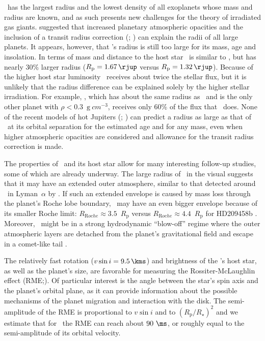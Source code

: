 \tresFour\ has the largest radius and the lowest density of all exoplanets whose
mass and radius are known, and as such presents new challenges for the theory
of irradiated gas giants. \citet{Burrows_Hubeny_Budaj:apj:2007a} suggested that increased planetary atmospheric opacities and the inclusion of a transit radius correction
(\citealp{Baraffe_Chabrier_Barman:aa:2003a}; \citealp*{Burrows_Sudarsky_Hubbard:apj:2003a}) can explain the radii of all large planets. It appears,
however, that \tresFour's radius is still too large for its mass, age and
insolation. In terms of mass and distance to the host star \tresFour\ is similar
to \hdTZN, but has nearly 30\% larger radius ($R_{\mathrm p} = 1.67\,\rjup$ versus $R_{\mathrm p} = 1.32\,\rjup$). Because of the higher host star luminosity \tresFour\ receives about twice the stellar flux, but it is unlikely that the radius difference can be explained solely by the higher stellar
irradiation. For example, \hatponeb, which has about the same radius as
\hdTZN\ and is the only other planet with $\rho < 0.3$~${\mathrm g \: cm^{-3}}$,
receives only 60\% of the flux that \hdTZN\ does. None of the recent models
of hot Jupiters (\citealp*[e.g.,][]{Fortney_Marley_Barnes:apj:2007a}; \citealp{Burrows_Hubeny_Budaj:apj:2007a}) can predict a radius as %
large as that of \tresFour\ at its orbital separation for the estimated age and
for any mass, even when higher atmospheric opacities are considered and
allowance for the transit radius correction is made.

The properties of \tresFour\ and its host star allow for many interesting follow-up
studies, some of which are already underway. The large radius of \tresFour\ in the
visual suggests that it may have an extended outer atmosphere, similar to that
detected around \hdTZN\ in Lyman~$\alpha$ by \citet{Vidal-Madjar_Lecavelier-des-Etangs_Desert:nat:2003a}. If such an
extended envelope is caused by mass loss through the planet's Roche lobe
boundary, \tresFour\ may have an even bigger envelope because of its smaller
Roche limit: $R_{\mathrm Roche} \approx 3.5$~$R_{\mathrm p}$ versus
$R_{\mathrm Roche} \approx 4.4$~$R_{\mathrm p}$ for HD209458b \citep{Erkaev_Lammer_Kulikov:preprint:2007a}.
Moreover, \tresFour\ might be in a strong hydrodynamic ``blow-off'' regime where the
outer atmospheric layers are detached from the planet's gravitational field and
escape in a comet-like tail \citep{Vidal-Madjar_Lecavelier-des-Etangs_Desert:nat:2003a, Lecavelier-des-Etangs_Vidal-Madjar_McConnell:aa:2004a}.

The relatively fast rotation ($v \sin i = 9.5 \, \kms$) and brightness of the
\tresFour's host star, as well as the planet's size, are favorable for measuring
the Rossiter-McLaughlin effect (RME;\@\citealp[see, e.g.,][]{Gaudi_Winn:apj:2007a}). Of %
particular interest is the angle between the star's spin axis and the planet's
orbital plane, as it can provide information about the possible mechanisms of
the planet migration and interaction with the disk. The semi-amplitude of the
RME is proportional to $v \sin i$ and to $(R_{\mathrm p} / R_{\star})^2$ and we %
estimate that for \tresFour\ the RME can reach about $90~\ms$, or roughly equal to
the semi-amplitude of its orbital velocity. %
